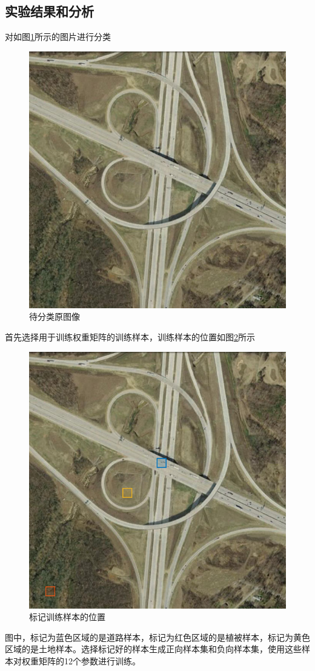 \subsection{实验结果和分析}
对如图\ref{fig:viaduct_52}所示的图片进行分类
\begin{figure}[H]
	\centering
	\includegraphics[width=0.7\linewidth]{figure/viaduct_52.jpg}
	\caption{待分类原图像}
	\label{fig:viaduct_52}
\end{figure}
首先选择用于训练权重矩阵的训练样本，训练样本的位置如图\ref{fig:viaduct_52_training_set}所示
\begin{figure}[H]
	\centering
	\includegraphics[width=0.7\linewidth]{figure/viaduct_52_Training_Set_Marker.png}
	\caption{标记训练样本的位置}
	\label{fig:viaduct_52_training_set}
\end{figure}
图中，标记为蓝色区域的是道路样本，标记为红色区域的是植被样本，标记为黄色区域的是土地样本。选择标记好的样本生成正向样本集和负向样本集，使用这些样本对权重矩阵的12个参数进行训练。

